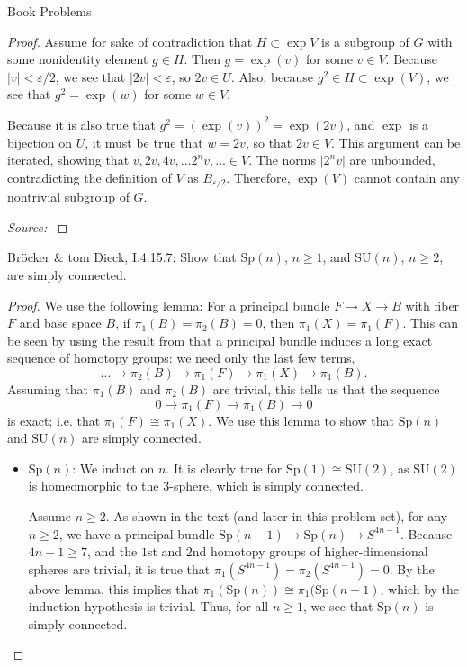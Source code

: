 \documentclass[12pt]{article}
\newcommand{\Sp}{\text{Sp}}
\theoremstyle{definition}
\newenvironment{problem}[2][Problem]{\begin{trivlist}
\item[\hskip \labelsep {\bfseries #1}\hskip \labelsep {\bfseries #2.}]}{\end{trivlist}}
\begin{document}
\begin{section}{Book Problems}
\begin{problem}{2}
\begin{proof}
			\par Assume for sake of contradiction that $H \subset \exp{V}$ is a subgroup of $G$ with some nonidentity element $g \in H$. Then $g = \exp(v)$ for some $v \in V$. Because $\lvert v \rvert < \varepsilon / 2$, we see that $\lvert 2v \rvert < \varepsilon$, so $2v \in U$. Also, because $g^2 \in H \subset \exp(V)$, we see that $g^2 = \exp(w)$ for some $w \in V$.
			\par Because it is also true that $g^2 = (\exp(v))^2 = \exp(2v)$, and $\exp$ is a bijection on $U$, it must be true that $w = 2v$, so that $2v \in V$. This argument can be iterated, showing that $v, 2v, 4v, ... 2^nv , ... \in V$. The norms $\lvert 2^n v \rvert$ are unbounded, contradicting the definition of $V$ as $B_{\varepsilon/2}$. Therefore, $\exp(V)$ cannot contain any nontrivial subgroup of $G$.
			\par \textit{Source: }\cite{devito}
		\end{proof}
	\end{problem}
    \begin{problem}{3}
	    Br\"ocker \& tom Dieck, I.4.15.7: Show that $\Sp(n)$, $n \geq 1$, and $\text{SU}(n)$, $n \geq 2$, are simply connected.
    \begin{proof}
			    \par We use the following lemma: For a principal bundle $F \to X \to B$ with fiber $F$ and base space $B$, if $\pi_1(B) = \pi_2(B) = 0$, then $\pi_1(X) = \pi_1(F)$. This can be seen by using the result from \cite{hall} that a principal bundle induces a long exact sequence of homotopy groups: we need only the last few terms,
			    \[ \dots \to \pi_2(B) \to \pi_1(F) \to \pi_1(X) \to \pi_1(B).\]
			    Assuming that $\pi_1(B)$ and $\pi_2(B)$ are trivial, this tells us that the sequence \[0 \to \pi_1(F) \to \pi_1(B) \to 0\] is exact; i.e. that $\pi_1(F) \cong \pi_1(X)$. We use this lemma to show that $\Sp(n)$ and $\text{SU}(n)$ are simply connected.
	    \begin{itemize}
		    \item $\Sp(n)$: We induct on $n$. It is clearly true for $\Sp(1) \cong \text{SU}(2)$, as $\text{SU}(2)$ is homeomorphic to the $3$-sphere, which is simply connected.
			    \par Assume $n \geq 2$. As shown in the text (and later in this problem set), for any $n \geq 2$, we have a principal bundle $\Sp(n-1) \to \Sp(n) \to S^{4n -1}$. Because $4n - 1 \geq 7$, and the $1$st and $2$nd homotopy groups of higher-dimensional spheres are trivial, it is true that $\pi_1(S^{4n-1}) = \pi_2(S^{4n-1}) = 0$. By the above lemma, this implies that $\pi_1(\Sp(n)) \cong \pi_1(\Sp(n-1)$, which by the induction hypothesis is trivial. Thus, for all $n \geq 1$, we see that $\Sp(n)$ is simply connected.

\end{itemize}
\end{proof}
\end{problem}
\end{section}
\end{document}
